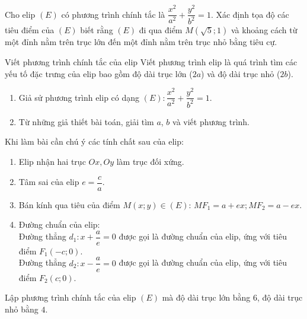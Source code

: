 \begin{bt}%
	Cho elip $(E)$ có phương trình chính tắc là $\dfrac{x^2}{a^2} + \dfrac{y^2}{b^2} = 1$. Xác định tọa độ các tiêu điểm của $(E)$ biết rằng $(E)$ đi qua điểm $M(\sqrt{5};1)$ và khoảng cách từ một đỉnh nằm trên trục lớn đến một đỉnh nằm trên trục nhỏ bằng tiêu cự.
\end{bt}

\begin{dang}{Viết phương trình chính tắc của elip}
Viết phương trình elip là quá trình tìm các yếu tố đặc trưng của elip bao gồm độ dài trục lớn ($2a$) và độ dài trục nhỏ ($2b$).
\begin{enumerate}[Bước 1.]
	\item Giả sử phương trình elip có dạng $(E)\colon\dfrac{x^{2}}{a^{2}}+\dfrac{y^{2}}{b^{2}}=1$.
	\item Từ những giả thiết bài toán, giải tìm $a$, $b$ và viết phương trình. 
\end{enumerate}
\begin{luuy}
	Khi làm bài cần chú ý các tính chất sau của elip:
	\begin{enumerate}
		\item Elip nhận hai trục $Ox,Oy$ làm trục đối xứng. 
		\item Tâm sai của elip $e=\dfrac{c}{a}$.
		\item Bán kính qua tiêu của điểm $M(x;y)\in (E)$: $MF_1=a+ex; MF_2=a-ex$.
		\item Đường chuẩn của elip:\\Đường thẳng $d_1: x+\dfrac{a}{e}=0$ được gọi là đường chuẩn của elip, ứng với tiêu điểm $F_1(-c;0)$.\\Đường thẳng $d_2: x-\dfrac{a}{e}=0$ được gọi là đường chuẩn của elip, ứng với tiêu điểm $F_2(c;0).$      
	\end{enumerate}
\end{luuy}
\end{dang}
\begin{vd}%
	Lập phương trình chính tắc của elip $(E)$ mà độ dài trục lớn bằng  $6$, độ dài trục nhỏ bằng $4$.
\end{vd}
